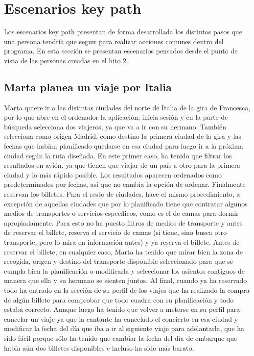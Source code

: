 \section{Escenarios key path}
Los escenarios key path presentan de forma desarrollada los distintos pasos que
una persona tendría que seguir para realizar acciones comunes dentro del
programa. En esta sección se presentan escenarios pensados desde el punto de
vista de las personas creadas en el hito 2.

\subsection{Marta planea un viaje por Italia}

Marta quiere ir a las distintas ciudades del norte de Italia de la gira de
Francesca, por lo que abre en el ordenador la aplicación, inicia sesión y en la
parte de búsqueda selecciona dos viajeros, ya que va a ir con su hermano.
También selecciona como origen Madrid, como destino la primera ciudad de la
gira y las fechas que habían planificado quedarse en esa ciudad para luego ir a
la próxima ciudad según la ruta diseñada. En este primer caso, ha tenido que
filtrar los resultados en avión, ya que tienen que viajar de un país a otro
para la primera ciudad y lo más rápido posible. Los resultados aparecen
ordenados como predeterminados por fechas, así que no cambia la opción de
ordenar. Finalmente reservan los billetes. Para el resto de ciudades, hace el
mismo procedimiento, a excepción de aquellas ciudades que por lo planificado
tiene que contratar algunos medios de transportes o servicios específicos, como
es el de camas para dormir apropiadamente. Para esto no ha puesto filtros de
medios de transporte y antes de reservar el billete, reserva el servicio de
camas (si tiene, sino busca otro transporte, pero lo mira en información antes)
y ya reserva el billete. Antes de reservar el billete, en cualquier caso, Marta
ha tenido que mirar bien la zona de recogida, origen y destino del transporte
disponible seleccionado para que se cumpla bien la planificación o modificarla
y seleccionar los asientos contiguos de manera que ella y su hermano se sienten
juntos. Al final, cuando ya ha reservado todo ha entrado en la sección de su
perfil de los viajes que ha realizado la compra de algún billete para comprobar
que todo cuadra con su planificación y todo estaba correcto. Aunque luego ha
tenido que volver a meterse en su perfil para cancelar un viaje ya que la
cantante ha cancelado el concierto en esa ciudad y modificar la fecha del día
que iba a ir al siguiente viaje para adelantarla, que ha sido fácil porque sólo
ha tenido que cambiar la fecha del día de embarque que había aún dos billetes
disponibles e incluso ha sido más barato.

